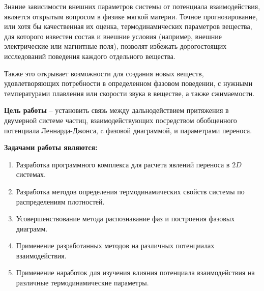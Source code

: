 Знание зависимости внешних параметров системы от потенциала взаимодействия, является открытым вопросом в физике мягкой материи. Точное прогнозирование, или хотя бы качественная их оценка, термодинамических параметров вещества, для которого известен состав и внешние условия (например, внешние электрические или магнитные поля), позволят избежать дорогостоящих исследований поведения каждого отдельного вещества. 

Также это открывает возможности для создания новых веществ, удовлетворяющих потребности в определенном фазовом поведении, с нужными температурами плавления или скорости звука в веществе, а также сжимаемости.

\newpage

\textbf{Цель работы} --
установить связь между дальнодействием притяжения в двумерной системе частиц, взаимодействующих посредством обобщенного потенциала Леннарда-Джонса, c фазовой диаграммой, и параметрами переноса.

\textbf{Задачами работы являются:}
\begin{enumerate}
\item Разработка программного комплекса для расчета явлений переноса в $2D$ системах.
\item Разработка методов определения термодинамических свойств системы по распределениям плотностей. 
\item Усовершенствование метода распознавание фаз и построения фазовых диаграмм.
\item Применение разработанных методов на различных потенциалах взаимодействия.
\item Применение наработок для изучения влияния потенциала взаимодействия на различные термодинамические параметры.
\end{enumerate}
